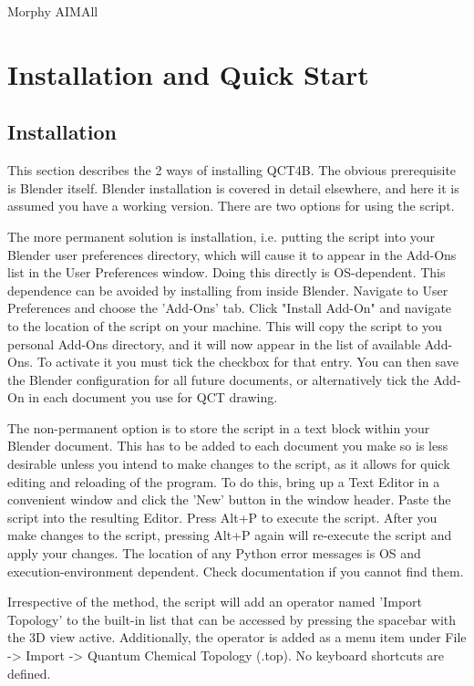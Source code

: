 \documentclass{report}
\begin{document}
Morphy
AIMAll

\chapter{Installation and Quick Start}

\section{Installation}

This section describes the 2 ways of installing QCT4B. The obvious prerequisite is Blender itself. 
Blender installation is covered in detail elsewhere, and here it is assumed you have a working version.
There are two options for using the script.

The more permanent solution is installation, i.e. putting the script into your Blender user preferences directory, which will cause it to appear in the Add-Ons list in the User Preferences window.
Doing this directly is OS-dependent.
This dependence can be avoided by installing from inside Blender.
Navigate to User Preferences and choose the 'Add-Ons' tab.
Click "Install Add-On" and navigate to the location of the script on your machine.
This will copy the script to you personal Add-Ons directory, and it will now appear in the list of available Add-Ons.
To activate it you must tick the checkbox for that entry. 
You can then save the Blender configuration for all future documents, or alternatively tick the Add-On in each document you use for QCT drawing.

The non-permanent option is to store the script in a text block within your Blender document. 
This has to be added to each document you make so is less desirable unless you intend to make changes to the script, as it allows for quick editing and reloading of the program.
To do this, bring up a Text Editor in a convenient window and click the 'New' button in the window header.
Paste the script into the resulting Editor.
Press Alt+P to execute the script. 
After you make changes to the script, pressing Alt+P again will re-execute the script and apply your changes. 
The location of any Python error messages is OS and execution-environment dependent.
Check documentation if you cannot find them.

Irrespective of the method, the script will add an operator named 'Import Topology' to the built-in list that can be accessed by pressing the spacebar with the 3D view active.
Additionally, the operator is added as a menu item under File -> Import -> Quantum Chemical Topology (.top).
No keyboard shortcuts are defined.
\end{document}
